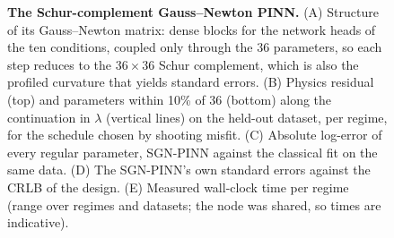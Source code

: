 \begin{figure}[tbp]
\centering
{}
\caption{\textbf{The Schur-complement Gauss--Newton PINN.} (A) Structure of its
Gauss--Newton matrix: dense blocks for the network heads of the ten conditions,
coupled only through the 36 parameters, so each step reduces to the $36\times36$
Schur complement, which is also the profiled curvature that yields standard
errors. (B) Physics residual (top) and parameters within 10\% of 36 (bottom)
along the continuation in $\lambda$ (vertical lines) on the held-out dataset,
per regime, for the schedule chosen by shooting misfit. (C) Absolute log-error
of every regular parameter, SGN-PINN against the classical fit on the same data.
(D) The SGN-PINN's own standard errors against the CRLB of the design. (E)
Measured wall-clock time per regime (range over regimes and datasets; the node
was shared, so times are indicative).}
\label{fig:sgn}
\end{figure}
